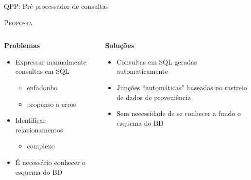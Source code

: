 \documentclass[12pt,compress,final]{beamer}
\newcommand{\todox}[2][]{\sethlcolor{yellow}\texthl{#1}\todo[author=\textbf{TODO},inline,color=yellow]{#2}}
\begin{document}
\begin{frame}[t]{QPP: Pré-processador de consultas}

\centerline{\large{\textsc{Proposta}}}

\begin{columns}[t]
    
\begin{column}{0.5\textwidth}

\centerline{\textbf{Problemas}}

\begin{itemize}
\item<1-> Expressar manualmente consultas em SQL
    \begin{itemize}
    \item enfadonho
    \item propenso a erros
    \end{itemize}
\item<2-> Identificar relacionamentos
    \begin{itemize}
    \item complexo
    \end{itemize}
\item<3-> É necessário conhecer o esquema do BD
\end{itemize}

\end{column}

\vrule{}

\begin{column}{0.5\textwidth}

\centerline{\textbf{Soluções}}

\begin{itemize}
    \item<1- | alert@1> Consultas em SQL geradas automaticamente
    \item<2- | alert@2> Junções ``automáticas'' baseadas no rastreio de dados de proveniência
    \item<3- | alert@3> Sem necessidade de se conhecer a fundo o esquema do BD
\end{itemize}

\end{column}

\end{columns}

\end{frame}

\end{document}
